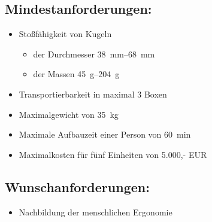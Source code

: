 \subsection{Mindestanforderungen:}

\begin{itemize}
	\item Stoßfähigkeit von Kugeln
	\begin{itemize}
		\item der Durchmesser \SIrange{38}{68}{\milli\metre}
		\item der Massen \SIrange{45}{204}{\gram}
	\end{itemize}
	\item Transportierbarkeit in maximal 3 Boxen
	\item Maximalgewicht von \SI{35}{\kilo\gram}
	\item Maximale Aufbauzeit einer Person von \SI{60}{\minute}
	\item Maximalkosten für fünf Einheiten von 5.000,- EUR
\end{itemize}

\subsection{Wunschanforderungen:}

\begin{itemize}
	\item Nachbildung der menschlichen Ergonomie
\end{itemize}